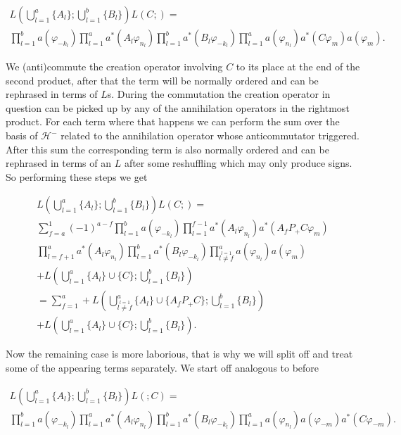 \documentclass[b5paper,draft,openbib,12pt]{memoir}
\begin{document}
\begin{multline}
L\left(\bigcup_{l=1}^a \{A_l\}; \bigcup_{l=1}^b \{B_l\}\right) L(C;)=\\
\prod_{l=1}^b a(\varphi_{-k_l}) \prod_{l=1}^a a^*(A_l \varphi_{n_l}) \prod_{l=1}^b a^*(B_l \varphi_{-k_l}) \prod_{l=1}^a a(\varphi_{n_l}) a^*(C \varphi_m) a(\varphi_m).
\end{multline}

We (anti)commute the creation operator involving \(C\) to its place at the end of the second product, after that the term
will be normally ordered and can be rephrased in terms of \(L\)s. During the commutation the creation operator
in question can be picked up by any of the annihilation operators in the rightmost product. For each term where that happens
we can perform the sum over the basis of \(\mathcal{H}^-\) related to the annihilation operator whose anticommutator triggered.
After this sum the corresponding term is also normally ordered and can be rephrased in terms of an \(L\) after some 
reshuffling which may only produce signs. So performing these steps we get

\begin{multline}
L\left(\bigcup_{l=1}^a \{A_l\}; \bigcup_{l=1}^b \{B_l\}\right) L(C;)=\\
\sum_{f=a}^1 (-1)^{a-f} \prod_{l=1}^b a(\varphi_{-k_l}) \prod_{l=1}^{f-1} a^*(A_l \varphi_{n_l}) a^*(A_fP_+C\varphi_m)\\
 \prod_{l=f+1}^a a^*(A_l \varphi_{n_l}) \prod_{l=1}^b a^*(B_l \varphi_{-k_l}) \prod_{\stackrel{l=1}{l\neq f}}^a a(\varphi_{n_l}) a(\varphi_m)\\
+ L\left(\bigcup_{l=1}^a \{A_l\} \cup \{C\}; \bigcup_{l=1}^b \{B_l\}\right)\\
=\sum_{f=1}^a + L\left(\bigcup_{\stackrel{l=1}{l \neq f}}^a \{A_l\} \cup \{A_f P_+ C\}; \bigcup_{l=1}^b \{B_l\}\right)\\
+ L\left(\bigcup_{l=1}^a \{A_l\} \cup \{C\}; \bigcup_{l=1}^b \{B_l\}\right).
\end{multline}

Now the remaining case is more laborious, that is why we will split off and treat some of the appearing terms separately. 
We start off analogous to before 

\begin{multline}
L\left(\bigcup_{l=1}^a \{A_l\}; \bigcup_{l=1}^b \{B_l\}\right) L(;C)=\\
\prod_{l=1}^b a(\varphi_{-k_l}) \prod_{l=1}^a a^*(A_l \varphi_{n_l}) \prod_{l=1}^b a^*(B_l \varphi_{-k_l}) \prod_{l=1}^a a(\varphi_{n_l})a(\varphi_{-m}) a^*(C \varphi_{-m}).
\end{multline}
\end{document}

